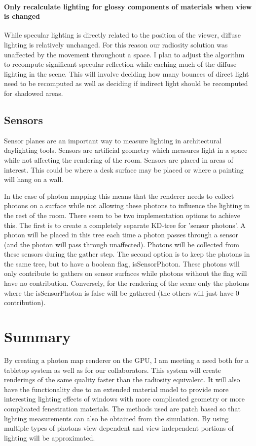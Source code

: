     \paragraph{Only recalculate lighting for glossy components of materials when view is changed}
    While specular lighting is directly related to the position of the viewer, diffuse lighting is relatively unchanged.  For this reason our radiosity solution was unaffected by the movement throughout a space.  I plan to adjust the algorithm to recompute significant specular reflection while caching much of the diffuse lighting in the scene.  This will involve deciding how many bounces of direct light need to be recomputed as well as deciding if indirect light should be recomputed for shadowed areas.
  \subsection{Sensors}
  Sensor planes are an important way to measure lighting in architectural daylighting tools.  Sensors are artificial geometry which measures light in a space while not affecting the rendering of the room.  Sensors are placed in areas of interest.  This could be where a desk surface may be placed or where a painting will hang on a wall.  
  
In the case of photon mapping this means that the renderer needs to collect photons on a surface while not allowing these photons to influence the lighting in the rest of the room.  There seem to be two implementation options to achieve this.  The first is to create a completely separate KD-tree for 'sensor photons'.  A photon will be placed in this tree each time a photon passes through a sensor (and the photon will pass through unaffected).  Photons will be collected from these sensors during the gather step.  The second option is to keep the photons in the same tree, but to have a boolean flag, isSensorPhoton.  These photons will only contribute to gathers on sensor surfaces while photons without the flag will have no contribution.  Conversely, for the rendering of the scene only the photons where the isSensorPhoton is false will be gathered (the others will just have 0 contribution).
  
\section{Summary}

By creating a photon map renderer on the GPU, I am meeting a need both for a tabletop system as well as for our collaborators.  This system will create renderings of the same quality faster than the radiosity equivalent.  It will also have the functionality due to an extended material model to provide more interesting lighting effects of windows with more complicated geometry or more complicated fenestration materials.  The methods used are patch based so that lighting measurements can also be obtained from the simulation.  By using multiple types of photons view dependent and view independent portions of lighting will be approximated.  
